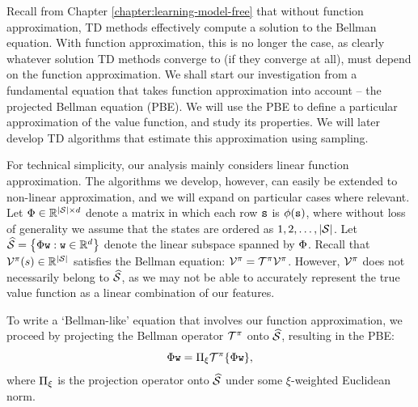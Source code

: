 Recall from Chapter \ref{chapter:learning-model-free} that without function approximation, TD methods effectively compute a solution to the Bellman equation. With function approximation, this is no longer the case, as clearly  whatever solution TD methods converge to (if they converge at all), must depend on the function approximation. We shall start our investigation from a fundamental equation that takes function approximation into account -- the projected Bellman equation (PBE). We will use the PBE to define a particular approximation of the value function, and study its properties. We will later develop TD algorithms that estimate this approximation using sampling.

For technical simplicity, our analysis mainly considers linear function approximation. The algorithms we develop, however, can easily be extended to non-linear  approximation, and we will expand on particular cases where relevant. Let $\Phi \in \mathbb{R}^{|\mathcal{S}|\times d}$ denote a matrix in which each row ${\tt s}$ is $\phi({\tt s})$, where without loss of generality we assume that the states are ordered as $1,2,\dots, |\mathcal{S}|$. 
Let $\widehat{\mathcal{S}} = \left\{ \Phi {\tt w}: {\tt w} \in \mathbb{R}^{d} \right\}$ denote the linear subspace spanned by $\Phi$.
Recall that $\mathcal{V}^\pi(s)\in\mathbb{R}^{|\mathcal{S}|}$ satisfies the Bellman equation: $\mathcal{V}^\pi = \mathcal{T}^\pi \mathcal{V}^\pi$. However, $\mathcal{V}^\pi$ does not necessarily belong to $\widehat{\mathcal{S}}$, as we may not be able to accurately represent the true value function as a linear combination of our features. 

To write a `Bellman-like' equation that involves our function approximation, we proceed by projecting the Bellman operator $\mathcal{T}^\pi$ onto $\widehat{\mathcal{S}}$, resulting in the PBE:
\begin{equation}\label{eq:PBE}
    \Phi {\tt w} = \Pi_{\xi} \mathcal{T}^\pi \{\Phi {\tt w}\},
\end{equation}
where $\Pi_{\xi}$ is the projection operator onto $\widehat{\mathcal{S}}$ under some $\xi$-weighted Euclidean norm.


